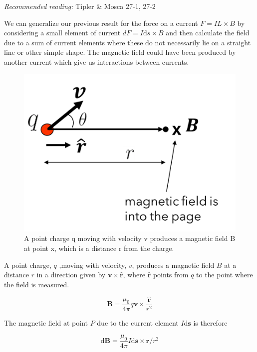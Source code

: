 \documentclass[
]{book}
\numberwithin{equation}{section}
\begin{document}
\emph{Recommended reading:} Tipler \& Mosca 27-1, 27-2

We can generalize our previous result for the force on a current
\(F = IL \times B\) by considering a small element of current
\(dF = I \mathrm{d} s \times B\) and then calculate the field due to a sum of
current elements where these do not necessarily lie on a straight line
or other simple shape. The magnetic field could have been produced by
another current which give us interactions between currents.

\begin{figure}

{\centering \includegraphics[width=0.7\linewidth]{Figures/fieldmovingcharge} 

}

\caption{A point charge q moving with velocity v produces a magnetic field B at point x, which is a distance r from the charge.}\label{fig:fieldmovingcharge}
\end{figure}

A point charge, \(q\) ,moving with velocity, \(v\), produces a magnetic
field \(B\) at a distance \(r\) in a direction given by
\(\mathbf{v} \times \hat{\mathbf{r}}\), where \(\hat{\mathbf{r}}\) points from \(q\) to the point
where the field is measured.

\begin{equation}
\label{eq:Bfield}
\mathbf{B} = \frac{\mu_0}{4\pi} q \mathbf{v} \times \frac{\hat{\mathbf{r}}}{r^2} 
\end{equation}

The magnetic field at point \(P\) due to the current element \(I \mathrm{d}\mathbf{s}\) is
therefore

\begin{equation}
\label{eq:BIelement}
\mathrm{d} \mathbf{B} = \frac{\mu_0}{4\pi}  I \mathrm{d}\mathbf{s} \times \mathbf{r} /r^2 
\end{equation}
\end{document}
